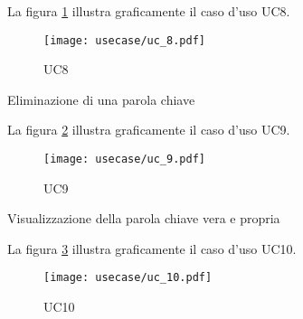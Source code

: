 \vspace{10pt}
\par\noindent
\begin{minipage}{\textwidth}
    La figura \ref{fig:uc8} illustra graficamente il caso d'uso UC8.
    \begin{figure}[H]
        \centering
        \texttt{[image: usecase/uc\_8.pdf]}
        \caption{UC8}
        \label{fig:uc8}
    \end{figure}
\end{minipage}

\begin{usecase}{9}{Eliminazione di una parola chiave}\label{UC9}
\end{usecase}

\vspace{10pt}
\par\noindent
\begin{minipage}{\textwidth}
    La figura \ref{fig:uc9} illustra graficamente il caso d'uso UC9.
    \begin{figure}[H]
        \centering
        \texttt{[image: usecase/uc\_9.pdf]}
        \caption{UC9}
        \label{fig:uc9}
    \end{figure}
\end{minipage}

\begin{usecase}{10}{Visualizzazione della parola chiave vera e propria}\label{UC10}
\end{usecase}

\vspace{10pt}
\par\noindent
\begin{minipage}{\textwidth}
    La figura \ref{fig:uc10} illustra graficamente il caso d'uso UC10.
    \begin{figure}[H]
        \centering
        \texttt{[image: usecase/uc\_10.pdf]}
        \caption{UC10}
        \label{fig:uc10}
    \end{figure}
\end{minipage}

